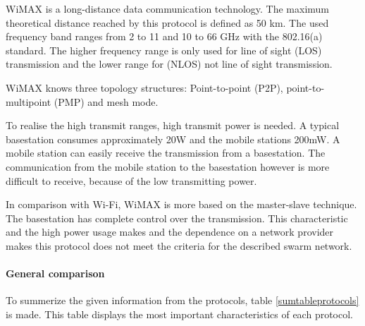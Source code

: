 \documentclass[10pt,a4paper]{article}
\begin{document}
WiMAX is a long-distance data communication technology. The maximum theoretical distance reached by this protocol is defined as 50 km. The used frequency band ranges from 2 to 11 and 10 to 66 GHz with the 802.16(a) standard. The higher frequency range is only used for line of sight (LOS) transmission and the lower range for (NLOS) not line of sight transmission.\cite{draadlozecommunicatie}

WiMAX knows three topology structures: Point-to-point (P2P), point-to-multipoint (PMP) and mesh mode. \cite{combook}

To realise the high transmit ranges, high transmit power is needed. A typical basestation consumes approximately 20W and the mobile stations 200mW. A mobile station can easily receive the transmission from a basestation. The communication from the mobile station to the basestation however is more difficult to receive, because of the low transmitting power.
\cite{wimax}

In comparison with Wi-Fi, WiMAX is more based on the master-slave technique. The basestation has complete control over the transmission. This characteristic and the high power usage makes and the dependence on a network provider makes this protocol does not meet the criteria for the described swarm network.\\

\paragraph{General comparison}
To summerize the given information from the protocols, table \ref{sumtableprotocols} is made. This table displays the most important characteristics of each protocol.
\end{document}
